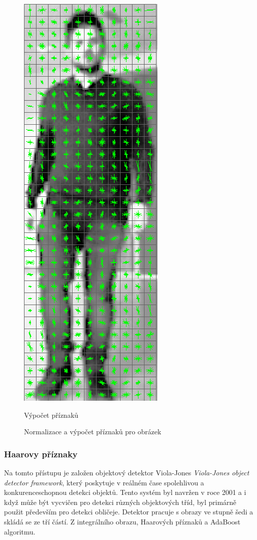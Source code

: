 \begin{figure}[H]
\begin{minipage}{.3\textwidth}
  \includegraphics[width=.5\linewidth]{figures/features}
  \caption*{Výpočet příznaků}
  \label{fig:hog_features}
\end{minipage}
\caption{Normalizace a výpočet příznaků pro obrázek}
\label{fig:hogCalc}
\end{figure}

\subsubsection*{Haarovy příznaky} %
Na tomto přístupu je založen objektový detektor Viola-Jones \textit{Viola-Jones object detector framework}, který poskytuje v reálném čase spolehlivou a konkurenceschopnou detekci objektů. Tento systém byl navržen v roce 2001 a i když může být vycvičen pro detekci různých objektových tříd, byl primárně použit především pro detekci obličeje. Detektor pracuje s obrazy ve stupně šedi a skládá se ze tří částí. Z integrálního obrazu, Haarových příznaků a AdaBoost algoritmu. 

